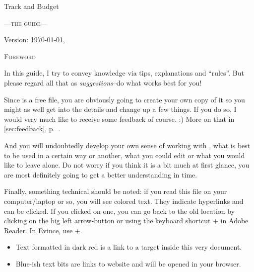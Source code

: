 
\begin{center}\LARGE
Track and Budget
\end{center}
\begin{center}\scshape\large\sffamily
	---the guide---
\end{center}

\vfill
\begin{center}
Version: \today, \thistime
\end{center}

\clearpage
\begin{center}\large\scshape
	Foreword
\end{center}
In this guide, I try to convey knowledge via tips, explanations and ``rules''.
But please regard all that as \emph{suggestions}--do what works best for you!

Since \tfn is a free file, you are obviously going to create your own copy of it so you might as well get into the details and change up a few things.
If you do so, I would very much like to receive some feedback of course. :)
More on that in \autoref{sec:feedback}, p.~\pageref{sec:feedback}.

And you will undoubtedly develop your own sense of working with \tfn, what is best to be used in a certain way or another, what you could edit or what you would like to leave alone.
Do not worry if you think it is a bit much at first glance, you are most definitely going to get a better understanding in time.

Finally, something technical should be noted: if you read this file on your computer/laptop or so, you will see colored text.
They indicate hyperlinks and can be clicked.
If you clicked on one, you can go back to the old location by clicking on the big left arrow-button or using the keyboard shortcut +\keystroke{\( \leftarrow \)}  in Adobe Reader.
In Evince, use +.
\begin{itemize}
	\item Text formatted in dark red is a link to a target inside this very document.
	\item Blue-ish text bits are links to website and will be opened in your browser.
\end{itemize}

